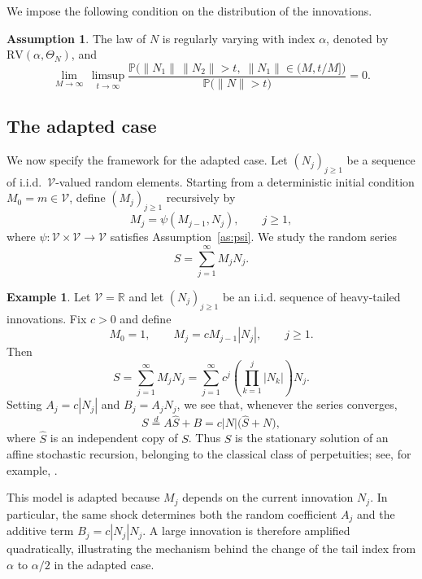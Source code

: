 \documentclass[preprint,12pt]{elsarticle}
\theoremstyle{definition}
\newtheorem{example}[thm]{Example}
\newtheorem{as}[thm]{Assumption}
\theoremstyle{remark}
\newcommand{\Mbf}{{ M}}
\newcommand{\Nbf}{{ N}}
\newcommand{\Sbf}{{ S}}
\newcommand{\mbf}{{ m}}
\newcommand{\1}{{\mathbf 1}}
\numberwithin{equation}{section}
\newcommand{\Pbb}{\mathbb{P}}
\newcommand{\Vcal}{\mathcal{V}}
\begin{document}
  We impose the following condition on the distribution of the innovations.

  \begin{as}\label{as:N}
    The law of $\Nbf$ is regularly varying with index $\alpha$, 
    denoted by $\mathrm{RV}(\alpha, \Theta_{\Nbf})$, and
    \begin{equation*}
      \lim_{M \to \infty} \, \limsup_{t \to \infty} 
      \frac{\Pbb\bigl( \|\Nbf_1\| \, \|\Nbf_2\| > t,\; 
      \|\Nbf_1\| \in (M, t/M] \bigr)}
      {\Pbb\bigl( \|\Nbf\| > t \bigr)} 
      = 0.
    \end{equation*}
  \end{as}

\subsection{The adapted case}

  We now specify the framework for the adapted case. 
  Let $(\Nbf_j)_{j \ge 1}$ be a sequence of i.i.d.\ $\Vcal$-valued random 
  elements. Starting from a deterministic initial condition 
  $\Mbf_0 = \mbf \in \Vcal$, define $(\Mbf_j)_{j \ge 1}$ recursively by
  \begin{equation*}
    \Mbf_j = \psi(\Mbf_{j-1}, \Nbf_j), 
    \qquad j \ge 1,
  \end{equation*}
  where $\psi \colon \Vcal \times \Vcal \to \Vcal$ satisfies 
  Assumption~\ref{as:psi}. We study the random series
  \begin{equation*}
    \Sbf = \sum_{j=1}^\infty \Mbf_j \Nbf_j.
  \end{equation*}

\begin{example}
Let $\Vcal=\mathbb{R}$ and let $(\Nbf_j)_{j\geq1}$ be an i.i.d.
sequence of heavy-tailed innovations. Fix $c>0$ and define
\begin{equation*}
\Mbf_0=1,
\qquad
\Mbf_j=c\Mbf_{j-1}|\Nbf_j|,
\qquad j\geq1.
\end{equation*}
Then
\begin{equation*}
\Sbf
=
\sum_{j=1}^{\infty}\Mbf_j\Nbf_j
=
\sum_{j=1}^{\infty}
c^j\left(\prod_{k=1}^j|\Nbf_k|\right)\Nbf_j.
\end{equation*}
Setting $A_j=c|\Nbf_j|$ and $B_j=A_j\Nbf_j$, we see that, whenever
the series converges,
\begin{equation*}
\Sbf
\stackrel{d}{=}
A\widehat{\Sbf}+B
=
c|\Nbf|\bigl(\widehat{\Sbf}+\Nbf\bigr),
\end{equation*}
where $\widehat{\Sbf}$ is an independent copy of $\Sbf$. Thus $\Sbf$
is the stationary solution of an affine stochastic recursion, belonging
to the classical class of perpetuities; see, for example,
\cite{goldie1991implicit}.

This model is adapted because $\Mbf_j$ depends on the current innovation
$\Nbf_j$. In particular, the same shock determines both the random
coefficient $A_j$ and the additive term
$B_j=c|\Nbf_j|\Nbf_j$. A large innovation is therefore amplified
quadratically, illustrating the mechanism behind the change of the tail
index from $\alpha$ to $\alpha/2$ in the adapted case.
\end{example}
\end{document}

